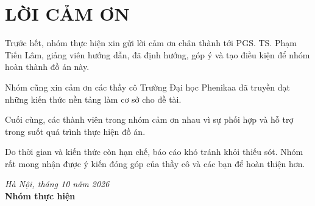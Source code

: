 \chapter*{LỜI CẢM ƠN}

Trước hết, nhóm thực hiện xin gửi lời cảm ơn chân thành tới PGS. TS. Phạm Tiến Lâm, giảng viên hướng dẫn, đã định hướng, góp ý và tạo điều kiện để nhóm hoàn thành đồ án này.

Nhóm cũng xin cảm ơn các thầy cô Trường Đại học Phenikaa đã truyền đạt những kiến thức nền tảng làm cơ sở cho đề tài.

Cuối cùng, các thành viên trong nhóm cảm ơn nhau vì sự phối hợp và hỗ trợ trong suốt quá trình thực hiện đồ án.

Do thời gian và kiến thức còn hạn chế, báo cáo khó tránh khỏi thiếu sót. Nhóm rất mong nhận được ý kiến đóng góp của thầy cô và các bạn để hoàn thiện hơn.

\vspace{1cm}
\begin{flushright}
\textit{Hà Nội, tháng 10 năm 2026}\\
\textbf{Nhóm thực hiện}
\end{flushright}
